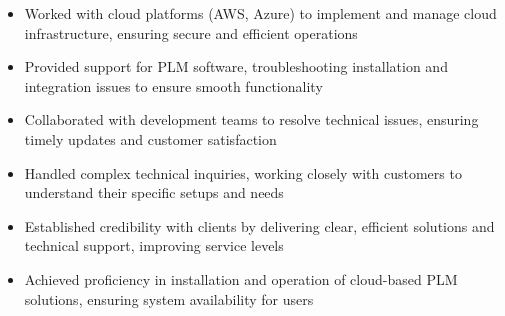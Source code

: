 \par\smallskip
\noindent
\begin{minipage}{20cm}
  \begin{minipage}{9.75cm}
    \begin{itemize}
      \item Worked with cloud platforms (AWS, Azure) to implement and manage cloud infrastructure, ensuring secure and efficient operations
      \item Provided support for PLM software, troubleshooting installation and integration issues to ensure smooth functionality
      \item Collaborated with development teams to resolve technical issues, ensuring timely updates and customer satisfaction
    \end{itemize}
  \end{minipage}
  \hfill
  \begin{minipage}{9.75cm}
    \begin{itemize}
      \item Handled complex technical inquiries, working closely with customers to understand their specific setups and needs
      \item Established credibility with clients by delivering clear, efficient solutions and technical support, improving service levels
      \item Achieved proficiency in installation and operation of cloud-based PLM solutions, ensuring system availability for users
    \end{itemize}
  \end{minipage}
\end{minipage}
\par\smallskip
\divider


